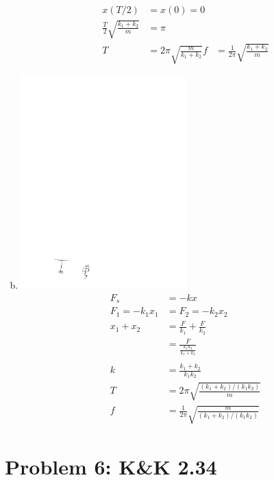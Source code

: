 \documentclass[solutions]{esg8012pset}
\begin{document}
\begin{enumerate}[a)]
\begin{align*}
      \\
      x(T/2) & = x(0) = 0 \\
      \frac{T}{2}\sqrt{\frac{k_1 + k_2}{m}} & = \pi \\
      T & = 2\pi\sqrt{\frac{m}{k_1 + k_2}}
      f & = \frac{1}{2\pi}\sqrt{\frac{k_1 + k_2}{m}}
    \end{align*}
    \item \includegraphics[width=0.5\textwidth]{2009-10-02_Diagram_5_2}\begin{align*}
     F_s & = -kx \\
     F_1 = -k_1 x_1 & = F_2 = -k_2 x_2 \\
     x_1 + x_2 & = \frac{F}{k_1} + \frac{F}{k_2} \\
     & = \frac{F}{\frac{k_1 k_2}{k_1 + k_2}} \\
     \\
     k & = \frac{k_1 + k_2}{k_1 k_2} \\
     T & = 2\pi\sqrt{\frac{(k_1+k_2)/(k_1 k_2)}{m}} \\
     f & = \frac{1}{2\pi}\sqrt{\frac{m}{(k_1+k_2)/(k_1 k_2)}}
   \end{align*}
  \end{enumerate}
\section*{Problem 6: K\&K 2.34}
\end{document}
